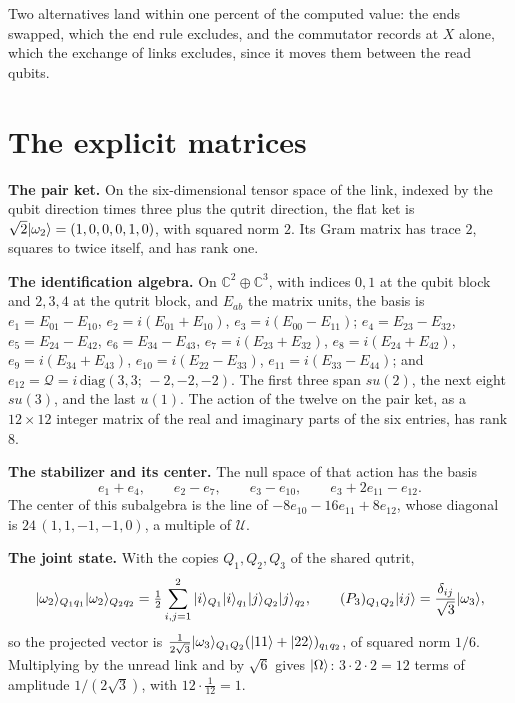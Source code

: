 Two alternatives land within one percent of the computed value: the ends swapped, which the end rule excludes, and the commutator records at $X$ alone, which the exchange of links excludes, since it moves them between the read qubits.

\section{The explicit matrices}
\label{sec:s-matrices}

\textbf{The pair ket.} On the six-dimensional tensor space of the link, indexed by the qubit direction times three plus the qutrit direction, the flat ket is $\sqrt{2}|\omega_{2}\rangle=(1,0,0,0,1,0)$, with squared norm $2$. Its Gram matrix has trace $2$, squares to twice itself, and has rank one.

\textbf{The identification algebra.} On $\mathbb{C}^{2}\oplus\mathbb{C}^{3}$, with indices $0,1$ at the qubit block and $2,3,4$ at the qutrit block, and $E_{ab}$ the matrix units, the basis is
$e_{1}=E_{01}-E_{10}$, $e_{2}=i(E_{01}+E_{10})$, $e_{3}=i(E_{00}-E_{11})$;
$e_{4}=E_{23}-E_{32}$, $e_{5}=E_{24}-E_{42}$, $e_{6}=E_{34}-E_{43}$, $e_{7}=i(E_{23}+E_{32})$, $e_{8}=i(E_{24}+E_{42})$, $e_{9}=i(E_{34}+E_{43})$, $e_{10}=i(E_{22}-E_{33})$, $e_{11}=i(E_{33}-E_{44})$;
and $e_{12}=\mathcal{Q}=i\,\mathrm{diag}(3,3;\,-2,-2,-2)$. The first three span $su(2)$, the next eight $su(3)$, and the last $u(1)$. The action of the twelve on the pair ket, as a $12\times 12$ integer matrix of the real and imaginary parts of the six entries, has rank $8$.

\textbf{The stabilizer and its center.} The null space of that action has the basis
\begin{equation}
e_{1}+e_{4},\qquad e_{2}-e_{7},\qquad e_{3}-e_{10},\qquad e_{3}+2e_{11}-e_{12}.
\end{equation}
The center of this subalgebra is the line of $-8e_{10}-16e_{11}+8e_{12}$, whose diagonal is $24\,(1,1,-1,-1,0)$, a multiple of $\mathcal{U}$.

\textbf{The joint state.} With the copies $Q_{1},Q_{2},Q_{3}$ of the shared qutrit,
\begin{equation}
|\omega_{2}\rangle_{Q_{1}q_{1}}|\omega_{2}\rangle_{Q_{2}q_{2}}=\tfrac{1}{2}\sum_{i,j=1}^{2}|i\rangle_{Q_{1}}|i\rangle_{q_{1}}|j\rangle_{Q_{2}}|j\rangle_{q_{2}},\qquad (P_{3})_{Q_{1}Q_{2}}|ij\rangle=\frac{\delta_{ij}}{\sqrt{3}}|\omega_{3}\rangle,
\end{equation}
so the projected vector is $\frac{1}{2\sqrt{3}}|\omega_{3}\rangle_{Q_{1}Q_{2}}(|11\rangle+|22\rangle)_{q_{1}q_{2}}$, of squared norm $1/6$. Multiplying by the unread link and by $\sqrt{6}$ gives $|\Omega\rangle$: $3\cdot 2\cdot 2=12$ terms of amplitude $1/(2\sqrt{3})$, with $12\cdot\frac{1}{12}=1$.

